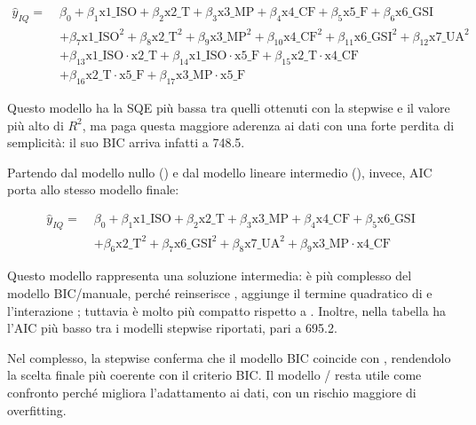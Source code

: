 \[
\begin{aligned}
\widehat{y}_{IQ}
=\;& \beta_0 + \beta_1 \text{x1\_ISO} + \beta_2 \text{x2\_T} + \beta_3 \text{x3\_MP}
+ \beta_4 \text{x4\_CF} + \beta_5 \text{x5\_F} + \beta_6 \text{x6\_GSI}
\\
&+ \beta_7 \text{x1\_ISO}^2 + \beta_8 \text{x2\_T}^2 + \beta_9 \text{x3\_MP}^2
+ \beta_{10} \text{x4\_CF}^2 + \beta_{11} \text{x6\_GSI}^2 + \beta_{12} \text{x7\_UA}^2
\\
&+ \beta_{13} \text{x1\_ISO}\cdot\text{x2\_T}
+ \beta_{14} \text{x1\_ISO}\cdot\text{x5\_F}
+ \beta_{15} \text{x2\_T}\cdot\text{x4\_CF}
\\
&+ \beta_{16} \text{x2\_T}\cdot\text{x5\_F}
+ \beta_{17} \text{x3\_MP}\cdot\text{x5\_F}
\end{aligned}
\]

Questo modello ha la SQE più bassa tra quelli ottenuti con la stepwise e il valore più alto di $R^2$, ma paga questa maggiore aderenza ai dati con una forte perdita di semplicità: il suo BIC arriva infatti a 748.5.

Partendo dal modello nullo (\texttt{}) e dal modello lineare intermedio (\texttt{}), invece, AIC porta allo stesso modello finale:

\[
\begin{aligned}
\widehat{y}_{IQ}
=\;& \beta_0 + \beta_1 \text{x1\_ISO} + \beta_2 \text{x2\_T} + \beta_3 \text{x3\_MP}
+ \beta_4 \text{x4\_CF} + \beta_5 \text{x6\_GSI}
\\
&+ \beta_6 \text{x2\_T}^2 + \beta_7 \text{x6\_GSI}^2 + \beta_8 \text{x7\_UA}^2
+ \beta_9 \text{x3\_MP}\cdot\text{x4\_CF}
\end{aligned}
\]

Questo modello rappresenta una soluzione intermedia: è più complesso del modello BIC/manuale, perché reinserisce \texttt{}, aggiunge il termine quadratico di \texttt{} e l'interazione \texttt{}; tuttavia è molto più compatto rispetto a \texttt{}. Inoltre, nella tabella ha l'AIC più basso tra i modelli stepwise riportati, pari a 695.2.

Nel complesso, la stepwise conferma che il modello BIC coincide con \texttt{}, rendendolo la scelta finale più coerente con il criterio BIC. Il modello \texttt{}/\texttt{} resta utile come confronto perché migliora l'adattamento ai dati, con un rischio maggiore di overfitting.

